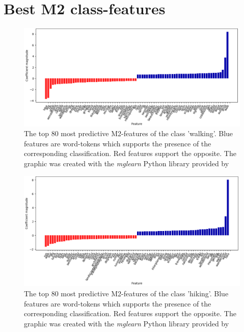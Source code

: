 \chapter{Best M2 class-features} \label{M2_top_features}
\begin{figure}[h!]
   \centering
   \includegraphics[width=\textwidth]{img/m2_top40_features_walking_cropped.pdf}
   \caption{The top 80 most predictive M2-features of the class 'walking'. Blue features are word-tokens which supports the presence of the corresponding classification. Red features support the opposite. The graphic was created with the \textit{mglearn} Python library provided by \textcite{Guido2016}}
   \label{fig:M2_top40_features_walking}
\end{figure}
\begin{figure}[h!]
   \centering
   \includegraphics[width=\textwidth]{img/m2_top40_features_hiking_cropped.pdf}
   \caption{The top 80 most predictive M2-features of the class 'hiking'. Blue features are word-tokens which supports the presence of the corresponding classification. Red features support the opposite. The graphic was created with the \textit{mglearn} Python library provided by \textcite{Guido2016}}
   \label{fig:M2_top40_features_hiking}
\end{figure}
